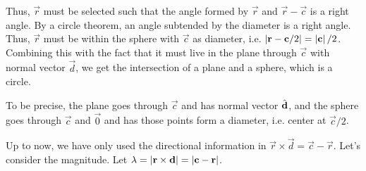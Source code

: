 \documentclass[12pt]{article}
\begin{document}
\begin{answer}
        \begin{center}
        \end{center}

        Thus, $\vec{r}$ must be selected such that
        the angle formed by $\vec{r}$ and $\vec{r}-\vec{c}$ is a right angle.
        By a circle theorem, an angle subtended by the diameter is a right angle.
        Thus, $\vec{r}$ must be within the sphere with $\vec{c}$ as diameter,
        i.e. $\left\lvert \mathbf{r} - \mathbf{c}/2 \right\rvert = \left\lvert \mathbf{c} \right\rvert/2$. Combining
        this with the fact that it must live in the plane through $\vec{c}$
        with normal vector $\vec{d}$, we get the intersection of a plane
        and a sphere, which is a circle.

        To be precise, the plane goes through $\vec{c}$
        and has normal vector $\hat{\mathbf{d}}$, and the
        sphere goes through $\vec{c}$ and $\vec{0}$ and has those
        points form a diameter, i.e. center at $\vec{c}/2$.

        Up to now, we have only used the directional information in
        $\vec{r}\times\vec{d} = \vec{c}-\vec{r}$.
        Let's consider the magnitude. Let 
        $\lambda = \left\lvert \mathbf{r}\times\mathbf{d} \right\rvert = \left\lvert \mathbf{c}-\mathbf{r} \right\rvert$.


\end{answer}
\end{document}
